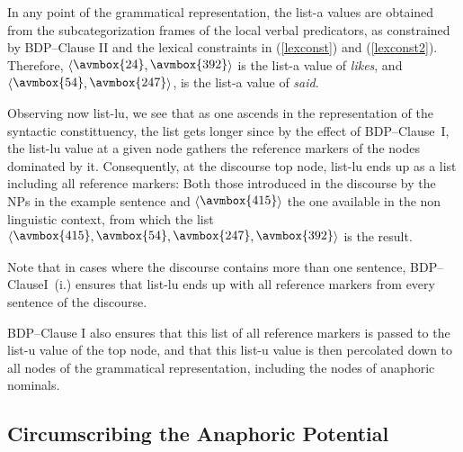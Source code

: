 \documentclass[output=paper
,modfonts
,nonflat]{langsci/langscibook}
\begin{document}
In any point of the grammatical 
representation,
the {\sc list-a} values are obtained from the 
subcategorization frames of the local verbal predicators, as constrained
by BDP--Clause II and the lexical constraints in (\ref{lexconst}) 
and (\ref{lexconst2}). Therefore,
$\langle\raisebox{.25ex}{\avmbox{24}},\raisebox{.25ex}{\avmbox{392}}\rangle$
is the {\sc list-a} value of \emph{likes}, and 
$\langle\raisebox{.25ex}{\avmbox{54}},\raisebox{.25ex}{\avmbox{247}}\rangle$,
is the {\sc list-a} value of \emph{said}.

Observing now {\sc list-lu}, we see that as one ascends in 
the representation of the syntactic constittuency, the list gets longer since by the effect 
of BDP--Clause~I, the {\sc list-lu} value at a given node gathers the reference markers 
of the nodes dominated by it.  Consequently, at the discourse top
node, {\sc list-lu} ends up as a list including all reference markers: 
Both those introduced in the discourse by the NPs in the example sentence and
$\langle\raisebox{.25ex}{\avmbox{415}}\rangle$
the one available in the non
linguistic context, from which the list 
$\langle\raisebox{.25ex}{\avmbox{415}},\raisebox{.25ex}{\avmbox{54}},\raisebox{.25ex}{\avmbox{247}},\raisebox{.25ex}{\avmbox{392}}\rangle$
is the result. 

Note that in cases where the discourse contains
more than one sentence, BDP--ClauseI~(i.) ensures that
{\sc list-lu} ends up with  all reference markers 
from every sentence of the discourse. 

BDP--Clause I also ensures that
this list of all reference  markers is passed to the {\sc list-u} value of the
top node, and that this {\sc list-u} value is then percolated down to all nodes of the 
grammatical representation, including the nodes of anaphoric nominals.


\subsection{Circumscribing the Anaphoric Potential}\label{circAnaphPotential}
\end{document}
